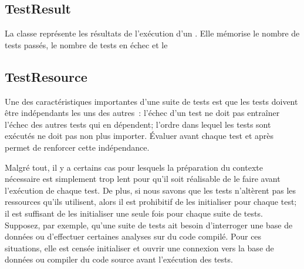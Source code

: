 \documentclass[a4paper,10pt,twoside]{book}
\begin{document}
\subsection{TestResult}

La classe  représente les résultats de
l'exécution d'un . Elle mémorise le nombre de tests
passés, le nombre de tests en échec et le  %

\subsection{TestResource}

Une des caractéristiques importantes d'une suite de tests est que les tests doivent être 
indépendants les uns des autres~: l'échec d'un test ne doit pas entraîner l'échec des 
autres tests qui en dépendent; l'ordre dans lequel les tests sont exécutés ne doit 
pas non plus importer.
Évaluer   avant chaque test et  après permet de renforcer cette indépendance.

Malgré tout, il y a certains cas pour lesquels la préparation du contexte nécessaire est simplement 
trop lent pour qu'il soit réalisable
de le faire avant l'exécution de chaque test. De plus, si nous savons que les tests n'altèrent pas 
les ressources qu'ils utilisent, alors il est prohibitif de les initialiser pour chaque test; il est 
suffisant de les initialiser une seule fois pour chaque suite de tests. Supposez, par exemple, 
qu'une suite de tests ait besoin d'interroger une base de données ou d'effectuer certaines analyses 
sur du code compilé.
Pour ces situations, elle est censée initialiser et ouvrir une connexion vers la base de données 
ou compiler du code source avant l'exécution des tests.
\end{document}
